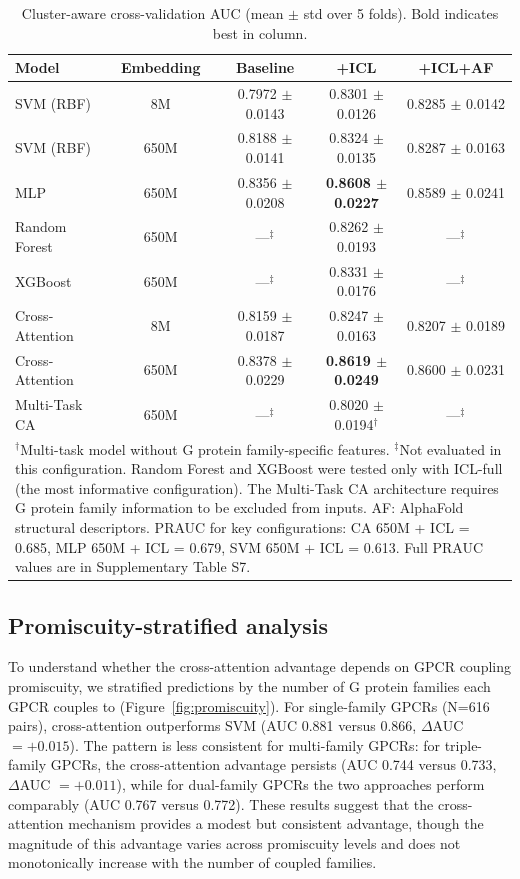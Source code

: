 \documentclass[11pt,a4paper]{article}
\begin{document}
\begin{table}[ht]
\centering
\caption{Cluster-aware cross-validation AUC (mean $\pm$ std over 5 folds). Bold indicates best in column.}
\label{tab:main}
\begin{tabular}{lcccc}
\toprule
Model & Embedding & Baseline & +ICL & +ICL+AF \\
\midrule
SVM (RBF)       & 8M   & 0.7972 $\pm$ 0.0143 & 0.8301 $\pm$ 0.0126 & 0.8285 $\pm$ 0.0142 \\
SVM (RBF)       & 650M & 0.8188 $\pm$ 0.0141 & 0.8324 $\pm$ 0.0135 & 0.8287 $\pm$ 0.0163 \\
MLP             & 650M & 0.8356 $\pm$ 0.0208 & \textbf{0.8608 $\pm$ 0.0227} & 0.8589 $\pm$ 0.0241 \\
Random Forest   & 650M & ---$^\ddagger$      & 0.8262 $\pm$ 0.0193 & ---$^\ddagger$ \\
XGBoost        & 650M & ---$^\ddagger$      & 0.8331 $\pm$ 0.0176 & ---$^\ddagger$ \\
Cross-Attention & 8M   & 0.8159 $\pm$ 0.0187 & 0.8247 $\pm$ 0.0163 & 0.8207 $\pm$ 0.0189 \\
Cross-Attention & 650M & 0.8378 $\pm$ 0.0229 & \textbf{0.8619 $\pm$ 0.0249} & 0.8600 $\pm$ 0.0231 \\
Multi-Task CA   & 650M & ---$^\ddagger$      & 0.8020 $\pm$ 0.0194$^\dagger$ & ---$^\ddagger$ \\
\bottomrule
\multicolumn{5}{p{0.88\textwidth}}{\small $^\dagger$Multi-task model without G protein family-specific features. \newline
$^\ddagger$Not evaluated in this configuration. Random Forest and XGBoost were tested only with ICL-full (the most informative configuration). The Multi-Task CA architecture requires G protein family information to be excluded from inputs. \newline
AF: AlphaFold structural descriptors. PRAUC for key configurations: CA 650M + ICL = 0.685, MLP 650M + ICL = 0.679, SVM 650M + ICL = 0.613. Full PRAUC values are in Supplementary Table S7.} \\
\end{tabular}
\end{table}

\subsection{Promiscuity-stratified analysis}

To understand whether the cross-attention advantage depends on GPCR coupling promiscuity, we stratified predictions by the number of G protein families each GPCR couples to (Figure~\ref{fig:promiscuity}). For single-family GPCRs (N=616 pairs), cross-attention outperforms SVM (AUC 0.881 versus 0.866, $\Delta$AUC $= +0.015$). The pattern is less consistent for multi-family GPCRs: for triple-family GPCRs, the cross-attention advantage persists (AUC 0.744 versus 0.733, $\Delta$AUC $= +0.011$), while for dual-family GPCRs the two approaches perform comparably (AUC 0.767 versus 0.772). These results suggest that the cross-attention mechanism provides a modest but consistent advantage, though the magnitude of this advantage varies across promiscuity levels and does not monotonically increase with the number of coupled families.
\end{document}
